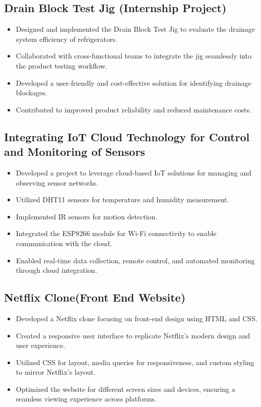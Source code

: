 \documentclass[letterpaper,10pt]{article}
\begin{document}
\subsection*{Drain Block Test Jig (Internship Project)}
\begin{itemize}
    \item Designed and implemented the Drain Block Test Jig to evaluate the drainage system efficiency of refrigerators.
    \item Collaborated with cross-functional teams to integrate the jig seamlessly into the product testing workflow.
    \item Developed a user-friendly and cost-effective solution for identifying drainage blockages.
    \item Contributed to improved product reliability and reduced maintenance costs.
\end{itemize}

\subsection*{Integrating IoT Cloud Technology for Control and Monitoring of Sensors}
\begin{itemize}
    \item Developed a project to leverage cloud-based IoT solutions for managing and observing sensor networks.
    \item Utilized DHT11 sensors for temperature and humidity measurement.
    \item Implemented IR sensors for motion detection.
    \item Integrated the ESP8266 module for Wi-Fi connectivity to enable communication with the cloud.
    \item Enabled real-time data collection, remote control, and automated monitoring through cloud integration.
\end{itemize}

\subsection*{Netflix Clone(Front End Website)}
\begin{itemize}
     \item Developed a Netflix clone focusing on front-end design using HTML and CSS.
    \item Created a responsive user interface to replicate Netflix's modern design and user experience.
    \item Utilized CSS for layout, media queries for responsiveness, and custom styling to mirror Netflix's layout.
    \item Optimized the website for different screen sizes and devices, ensuring a seamless viewing experience across platforms.
\end{itemize}
\end{document}
